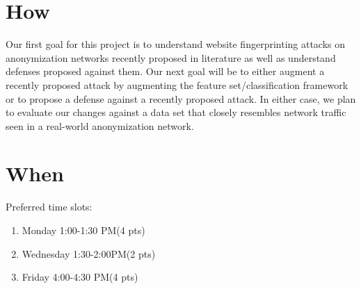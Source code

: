 \documentclass{article}
\begin{document}
\section{How}
Our first goal for this project is to understand website fingerprinting
attacks on anonymization networks recently proposed in literature as
well as understand defenses proposed against them. Our next goal will be
to either augment a recently proposed attack by augmenting the feature
set/classification framework or to propose a defense against a recently
proposed attack. In either case, we plan to evaluate our changes against
a data set that closely resembles network traffic seen in a real-world
anonymization network. 

\section{When}
Preferred time slots:
\begin{enumerate}
\item Monday 1:00-1:30 PM(4 pts)
\item Wednesday 1:30-2:00PM(2 pts)
\item Friday 4:00-4:30 PM(4 pts)

\end{enumerate}
\end{document}
